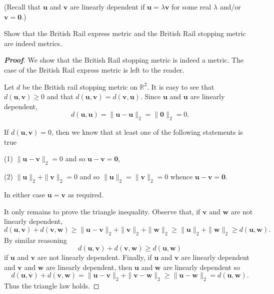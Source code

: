 (Recall that ${\mathbf u}$ and ${\mathbf v}$
are linearly dependent if ${\mathbf u}=\lambda{\mathbf v}$
for some real $\lambda$ and/or ${\mathbf v}={\mathbf  0}$.)

\begin{theorem}\label{P;British Rail is metric}
Show that the British Rail express metric
and the British Rail stopping metric are indeed metrics.
\end{theorem}
\begin{proof}[\bf Proof]
We show that the British Rail stopping metric is indeed a metric.
The case of the British Rail express metric is left to the reader.

Let $d$ be the British rail stopping metric on ${\mathbb R}^{2}$.
It is easy to see that $d({\mathbf u},{\mathbf v})\geq 0$
and that $d({\mathbf u},{\mathbf v})=d({\mathbf v},{\mathbf u})$.
Since ${\mathbf u}$ and ${\mathbf u}$ are linearly dependent,
\[d({\mathbf u},{\mathbf u})=\|{\mathbf u}-{\mathbf u}\|_{2}
=\|{\mathbf  0}\|_{2}=0.\]

If $d({\mathbf u},{\mathbf v})=0$, then we know that at least one
of the following statements is true

(1) $\|{\mathbf u}-{\mathbf v}\|_{2}=0$ and so
${\mathbf u}-{\mathbf v}={\mathbf  0}$,

(2) $\|{\mathbf u}\|_{2}+\|{\mathbf v}\|_{2}=0$ and so
$\|{\mathbf u}\|_{2}=\|{\mathbf v}\|_{2}=0$ whence
${\mathbf u}-{\mathbf v}={\mathbf  0}$.

\noindent In either case ${\mathbf u}={\mathbf v}$ as required.

It only remains to prove the triangle inequality.
Observe that, if ${\mathbf v}$ and ${\mathbf w}$ are not linearly
dependent,
\[d({\mathbf u},{\mathbf v})+d({\mathbf v},{\mathbf w})
\geq \|{\mathbf u}-{\mathbf v}\|_{2}
+\|{\mathbf v}\|_{2}+\|{\mathbf w}\|_{2}
\geq \|{\mathbf u}\|_{2}+\|{\mathbf w}\|_{2}\geq d({\mathbf u},{\mathbf w}).\]
By similar reasoning
\[d({\mathbf u},{\mathbf v})+d({\mathbf v},{\mathbf w})
\geq d({\mathbf u},{\mathbf w})\]
if ${\mathbf u}$ and ${\mathbf v}$ are not linearly
dependent. Finally, if ${\mathbf u}$ and ${\mathbf v}$ are linearly
dependent and ${\mathbf v}$ and ${\mathbf w}$ are linearly
dependent, then ${\mathbf u}$ and ${\mathbf w}$ are linearly
dependent so
\[d({\mathbf u},{\mathbf v})+d({\mathbf v},{\mathbf w})
= \|{\mathbf u}-{\mathbf v}\|_{2}
+\|{\mathbf v}-{\mathbf w}\|_{2}
\geq \|{\mathbf u}-{\mathbf w}\|_{2}=d({\mathbf u},{\mathbf w}).\]
Thus the triangle law holds.
\end{proof}

